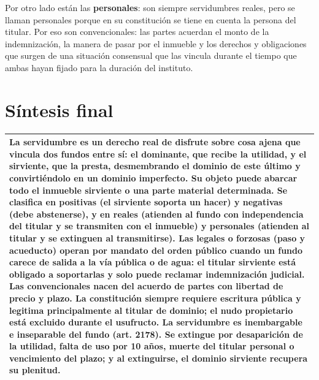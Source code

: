 \documentclass[12pt,oneside]{book}
\begin{document}
Por otro lado están las \textbf{personales}: son siempre servidumbres reales, pero se llaman personales porque en su constitución se tiene en cuenta la persona del titular. Por eso son convencionales: las partes acuerdan el monto de la indemnización, la manera de pasar por el inmueble y los derechos y obligaciones que surgen de una situación consensual que las vincula durante el tiempo que ambas hayan fijado para la duración del instituto.

\section*{Síntesis final}

\begin{table}[H]
\centering
\small
\begin{tabularx}{\textwidth}{X}
\toprule
La servidumbre es un derecho real de disfrute sobre cosa ajena que vincula dos fundos entre sí: el dominante, que recibe la utilidad, y el sirviente, que la presta, desmembrando el dominio de este último y convirtiéndolo en un dominio imperfecto. Su objeto puede abarcar todo el inmueble sirviente o una parte material determinada. Se clasifica en positivas (el sirviente soporta un hacer) y negativas (debe abstenerse), y en reales (atienden al fundo con independencia del titular y se transmiten con el inmueble) y personales (atienden al titular y se extinguen al transmitirse). Las legales o forzosas (paso y acueducto) operan por mandato del orden público cuando un fundo carece de salida a la vía pública o de agua: el titular sirviente está obligado a soportarlas y solo puede reclamar indemnización judicial. Las convencionales nacen del acuerdo de partes con libertad de precio y plazo. La constitución siempre requiere escritura pública y legitima principalmente al titular de dominio; el nudo propietario está excluido durante el usufructo. La servidumbre es inembargable e inseparable del fundo (art. 2178). Se extingue por desaparición de la utilidad, falta de uso por 10 años, muerte del titular personal o vencimiento del plazo; y al extinguirse, el dominio sirviente recupera su plenitud. \\
\bottomrule
\end{tabularx}
\end{table}
\end{document}
